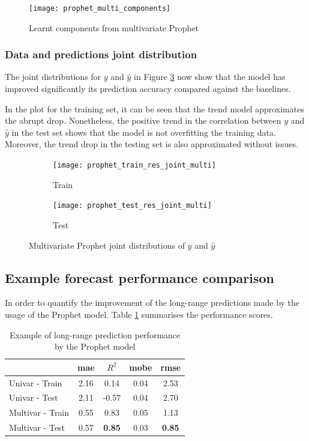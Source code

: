 \begin{figure}[H]
	\centering
	\texttt{[image: prophet\_multi\_components]}
	\caption{Learnt components from multivariate Prophet}
	\label{fig:prophet_multi_components}
\end{figure}

\subsubsection*{Data and predictions joint distribution}

The joint distributions for $y$ and $\hat{y}$ in Figure \ref{fig:prophet_test_res_joint_multi} now show that the model has improved significantly  its prediction accuracy compared against the baselines. 

In the plot for the training set, it can be seen that the trend model approximates the abrupt drop. Nonetheless, the positive trend in the correlation between  $y$ and $\hat{y}$ in the test set shows that the model is not overfitting the training data. Moreover, the trend drop in the testing set is also approximated without issues. 

\begin{figure}[hptb]
	\centering
	\begin{subfigure}{.49\textwidth}
		\texttt{[image: prophet\_train\_res\_joint\_multi]}
		\caption{Train}
		\label{fig:prophet_train_res_joint_multi}
	\end{subfigure}%
	\hfill
	\begin{subfigure}{.49\textwidth}
		\texttt{[image: prophet\_test\_res\_joint\_multi]}
		\caption{Test}
		\label{fig:prophet_test_res_joint_multi}
	\end{subfigure}
	\caption{Multivariate Prophet joint distributions of $y$ and $\hat{y}$}
	\label{fig:prophet_res_joint_multi}
\end{figure}


\subsection{Example forecast performance comparison}

In order to quantify the improvement of the long-range predictions made by the usage of the Prophet model. Table \ref{table:prophet_scores} summarises the performance scores.

\begin{table}[H]
\centering
\begin{tabular}{|l|c|c|c|c|}
	\hline
					& \ac{mae}	&	$R^2$		& \ac{mobe}  & \ac{rmse} 	\\
	\hline 												
	Univar - Train 	&	2.16	&	0.14		& 	0.04	&	2.53		\\
	Univar - Test 	&	2.11	&	-0.57		&	0.04	&	2.70		\\
	Multivar - Train&	0.55	&	0.83		& 	0.05	&	1.13		\\
	Multivar - Test &	0.57	&\textbf{0.85}	&	0.03	&\textbf{0.85}	\\
	\hline
\end{tabular}
\caption{Example of long-range prediction performance by the Prophet model}
\label{table:prophet_scores}
\end{table}


